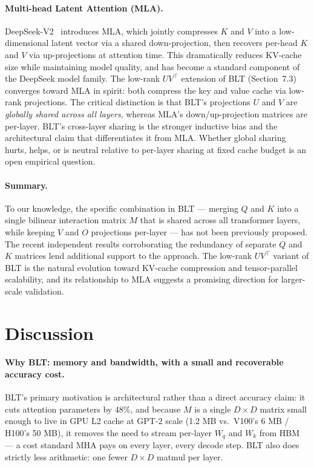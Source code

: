 \documentclass[11pt]{article}
\begin{document}
\paragraph{Multi-head Latent Attention (MLA).} DeepSeek-V2~\cite{deepseekv2} introduces MLA, which jointly compresses $K$ and $V$ into a low-dimensional latent vector via a shared down-projection, then recovers per-head $K$ and $V$ via up-projections at attention time. This dramatically reduces KV-cache size while maintaining model quality, and has become a standard component of the DeepSeek model family. The low-rank $UV^\top$ extension of BLT (Section~7.3) converges toward MLA in spirit: both compress the key and value cache via low-rank projections. The critical distinction is that BLT's projections $U$ and $V$ are \emph{globally shared across all layers}, whereas MLA's down/up-projection matrices are per-layer. BLT's cross-layer sharing is the stronger inductive bias and the architectural claim that differentiates it from MLA. Whether global sharing hurts, helps, or is neutral relative to per-layer sharing at fixed cache budget is an open empirical question.

\paragraph{Summary.} To our knowledge, the specific combination in BLT --- merging $Q$ and $K$ into a single bilinear interaction matrix $M$ that is shared across all transformer layers, while keeping $V$ and $O$ projections per-layer --- has not been previously proposed. The recent independent results corroborating the redundancy of separate $Q$ and $K$ matrices lend additional support to the approach. The low-rank $UV^\top$ variant of BLT is the natural evolution toward KV-cache compression and tensor-parallel scalability, and its relationship to MLA suggests a promising direction for larger-scale validation.

\section{Discussion}

\paragraph{Why BLT: memory and bandwidth, with a small and recoverable accuracy cost.} BLT's primary motivation is architectural rather than a direct accuracy claim: it cuts attention parameters by 48\%, and because $M$ is a single $D\times D$ matrix small enough to live in GPU L2 cache at GPT-2 scale (1.2 MB vs.\ V100's 6 MB / H100's 50 MB), it removes the need to stream per-layer $W_q$ and $W_k$ from HBM --- a cost standard MHA pays on every layer, every decode step. BLT also does strictly less arithmetic: one fewer $D\times D$ matmul per layer.
\end{document}
